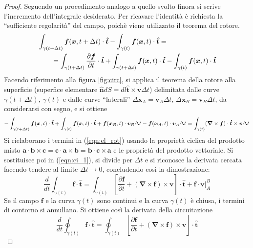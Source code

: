 \begin{proof}
Seguendo un procedimento analogo a quello svolto finora si scrive l'incremento dell'integrale desiderato. Per ricavare 
 l'identità è richiesta la ``sufficiente regolarità'' del campo, poichè viene utilizzato il teorema del rotore. \vspace{-0.3cm}
\begin{equation}
\begin{aligned}
  & \int_{\gamma(t+\Delta t)} \bm{f}(\bm{x},t + \Delta t) \cdot \bm{\hat{t}} -   \int_{\gamma(t)} \bm{f}(\bm{x},t) \cdot \bm{\hat{t}} = \\
  & \qquad  =  \int_{\gamma(t+\Delta t)} \dfrac{\partial \bm{f}}{\partial t} \cdot \bm{\hat{t}} +
       \int_{\gamma(t+\Delta t)} \bm{f}(\bm{x},t) \cdot \bm{\hat{t}}
   -   \int_{\gamma(t)} \bm{f}(\bm{x},t)  \cdot \bm{\hat{t}}
\end{aligned}
\label{eqn:ci_1} \vspace{-0.3cm}
\end{equation} 
%
Facendo riferimento alla figura \ref{fig:circ}, si applica il teorema della rotore alla superficie (superfice elementare $\bm{\hat{n}}dS = dl \bm{\hat{t}} \times \bm{v} \Delta t$)
 delimitata dalle curve $\gamma(t+\Delta t)$, $\gamma(t)$ e dalle curve ``laterali''
 $\Delta\bm{x}_A = \bm{v}_A \Delta t$,  $\Delta \bm{x}_B = \bm{v}_B \Delta t$, da considerarsi con segno, e si ottiene  \vspace{-0.3cm}
\begin{equation}
  -\int_{\gamma(t+\Delta t)} \bm{f}(\bm{x},t) \cdot \bm{\hat{t}} +  \int_{\gamma(t)} \bm{f}(\bm{x},t)  \cdot \bm{\hat{t}} +
  \bm{f}(\bm{x}_B,t)\cdot\bm{v}_B \Delta t -  \bm{f}(\bm{x}_A,t)\cdot\bm{v}_A \Delta t =
  \int_{\gamma(t)} (\bm{\nabla} \times \bm{f}) \cdot \bm{\hat{t}} \times \bm{v} \Delta t
\label{eqn:el_rot}\vspace{-0.5cm}
\end{equation}
%
Si rielaborano i termini in (\ref{eqn:el_rot}) usando la proprietà ciclica del prodotto misto
 $\bm{a} \cdot \bm{b}\times\bm{c} = \bm{c} \cdot \bm{a}\times\bm{b} = 
 \bm{b} \cdot \bm{c}\times\bm{a}$ e le proprietà del prodotto vettoriale. Si sostituisce poi in (\ref{eqn:ci_1}), si divide per $\Delta t$ e 
 si riconosce la derivata cercata facendo tendere al limite $\Delta t \rightarrow 0$, concludendo così la dimostrazione:
\begin{equation}
\frac{d}{dt}\int_{\gamma(t)} \bm{f}\cdot\bm{\hat{t}} = 
  \int_{\gamma(t)} \left[ \frac{\partial \bm{f}}{\partial t} + 
  (\bm{\nabla}\times\bm{f})\times\bm{v} \right]\cdot\bm{\hat{t}} +
  \bm{f}\cdot\bm{v}\bigg|_A^B 
\end{equation}
Se il campo $\bm{f}$ e la curva $\gamma(t)$ sono continui e la curva $\gamma(t)$ è chiusa, i termini di contorno si annullano.
 Si ottiene così la derivata della circuitazione
\begin{equation}
\frac{d}{dt}\oint_{\gamma(t)} \bm{f}\cdot\bm{\hat{t}} = 
  \oint_{\gamma(t)} \left[ \frac{\partial \bm{f}}{\partial t} + 
  (\bm{\nabla}\times\bm{f})\times\bm{v} \right]\cdot\bm{\hat{t}}
\end{equation}
\end{proof}
